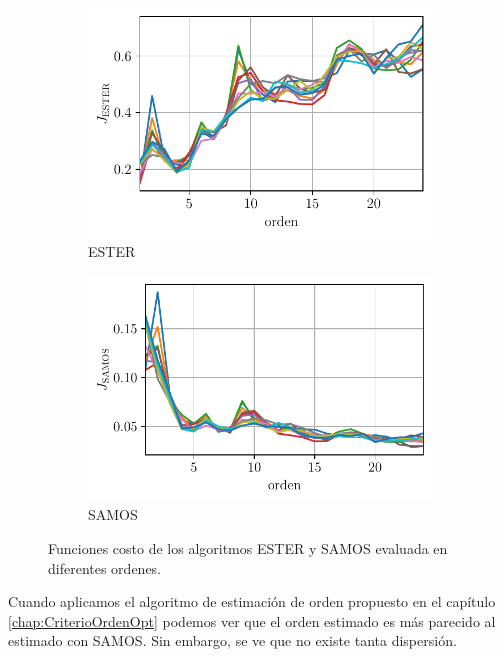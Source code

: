         \begin{figure}[ht]
            \centering
           \begin{subfigure}{0.4\linewidth}
			\centering
			\includegraphics[width = \linewidth]{Figuras/J_ester_UWB.pdf}
			\caption{ESTER}
		\end{subfigure}
        \begin{subfigure}{0.4\linewidth}
			\centering
			\includegraphics[width = \linewidth]{Figuras/J_samos_UWB.pdf}
			\caption{SAMOS}
		\end{subfigure}
        \caption{Funciones costo de los algoritmos ESTER y SAMOS evaluada en diferentes ordenes.}
        \label{Fig:EsterSamos_cil}    
        \end{figure}
        
        Cuando aplicamos el algoritmo de estimación de orden propuesto en el capítulo \ref{chap:CriterioOrdenOpt} podemos ver que el orden estimado es más parecido al estimado con SAMOS. Sin embargo, se ve que no existe tanta dispersión.

